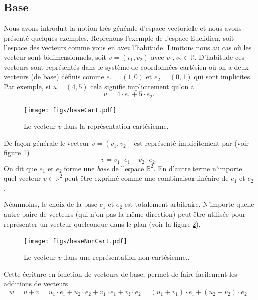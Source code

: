 \documentclass[a4paper,12pt]{book}
\newcommand{\real}{\mathbb{R}}
\begin{document}
\subsection{Base}

Nous avons introduit la notion très générale d'espace vectorielle et nous avons présenté quelques exemples.
Reprenons l'exemple de l'espace Euclidien, soit l'espace des vecteurs comme vous en avez l'habitude. Limitons nous
au cas où les vecteur sont bidimensionnels, soit $v=(v_1,v_2)$ avec $v_1,v_2\in\real$. D'habitude ces vecteurs sont représentés 
dans le système de coordonnées cartésien où on a deux vecteurs (de base) définis comme $e_1=(1,0)$ et $e_2=(0,1)$ qui
sont implicites. Par exemple, si $u=(4,5)$ cela signifie implicitement qu'on a
\begin{equation}
 u=4\cdot e_1+5\cdot e_2.
\end{equation}
\begin{figure}[htp]
\begin{center}
\texttt{[image: figs/baseCart.pdf]}
\end{center}
\caption{Le vecteur $v$ dans la représentation cartésienne.}\label{fig_baseCart}
\end{figure}
De façon générale le vecteur $v=(v_1,v_2)$ est représenté implicitement par (voir figure \ref{fig_baseCart})
\begin{equation}
 v=v_1\cdot e_1+v_2\cdot e_2.
\end{equation}
On dit que $e_1$ et $e_2$ forme une \textit{base} de l'espace $\real^2$. En d'autre terme n'importe
quel vecteur $v\in\real^2$ peut être exprimé comme une combinaison linéaire de $e_1$ et $e_2$.

Néanmoins, le choix de la base $e_1$ et $e_2$ est totalement arbitraire. N'importe quelle autre paire de vecteurs (qui n'on pas la même 
direction) peut être utilisée pour représenter un vecteur quelconque dans le plan (voir la figure \ref{fig_baseNonCart}).
\begin{figure}[htp]
\begin{center}
\texttt{[image: figs/baseNonCart.pdf]}
\end{center}
\caption{Le vecteur $v$ dans une représentation non cartésienne..}\label{fig_baseNonCart}
\end{figure}

Cette écriture en fonction de vecteurs de base, permet de faire facilement les additions de vecteurs
\begin{equation}
 w=u+v=u_1\cdot e_1+u_2\cdot e_2+v_1\cdot e_1+v_2\cdot e_2=(u_1+v_1)\cdot e_1+(u_2+v_2)\cdot e_2.
\end{equation}
\end{document}
